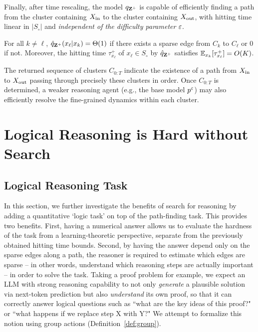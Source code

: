 Finally, after time rescaling, the model $q_{\mathbf{Z}^+}$ is capable of efficiently finding a path from the cluster containing $X_{\operatorname{in}}$ to the cluster containing $X_{\operatorname{out}}$, with hitting time linear in $|S_\circ|$ and \textit{independent of the difficulty parameter} $\varepsilon$.

\begin{thm}\label{thm:soda}
For all $k\ne\ell$, $\hat{q}_{\mathbf{Z}^+}(x_\ell|x_k) = \Theta(1)$ if there exists a sparse edge from $C_k$ to $C_\ell$ or $0$ if not. Moreover, the hitting time $\tau_{x_\ell}^+$ of $x_\ell\in S_\circ$ by $\hat{q}_{\mathbf{Z}^+}$ satisfies $\mathbb{E}_{x_k}[\tau_{x_\ell}^+] = O(K)$.
\end{thm}

The returned sequence of clusters $C_{0:T}$ indicate the existence of a path from $X_{\operatorname{in}}$ to $X_{\operatorname{out}}$ passing through precisely these clusters in order. Once $C_{0:T}$ is determined, a weaker reasoning agent (e.g., the base model $p^\varepsilon$) may also efficiently resolve the fine-grained dynamics within each cluster.


\section{Logical Reasoning is Hard without Search}\label{sec:hard}


\subsection{Logical Reasoning Task}

In this section, we further investigate the benefits of search for reasoning by adding a quantitative `logic task' on top of the path-finding task. This provides two benefits. First, having a numerical answer allows us to evaluate the hardness of the task from a learning-theoretic perspective, separate from the previously obtained hitting time bounds. Second, by having the answer depend only on the sparse edges along a path, the reasoner is required to estimate which edges are sparse -- in other words, understand which reasoning steps are actually important -- in order to solve the task. Taking a proof problem for example, we expect an LLM with strong reasoning capability to not only \emph{generate} a plausible solution via next-token prediction but also \emph{understand} its own proof, so that it can correctly answer logical questions such as ``what are the key ideas of this proof?" or ``what happens if we replace step X with Y?" We attempt to formalize this notion using group actions (Definition~\ref{def:group}).

